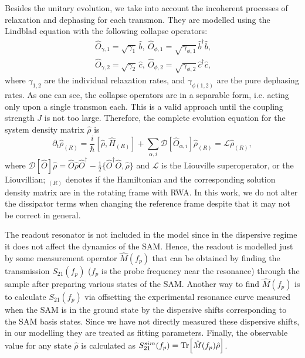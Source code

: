 \documentclass[%
 pra,
 amsmath,amssymb,
 reprint,%
]{revtex4-1}
\begin{document}
Besides the unitary evolution, we take into 
account the incoherent processes of relaxation 
and dephasing for each transmon. They are 
modelled using the Lindblad equation with the 
following collapse 
operators\cite{bishop2010circuit}:
\begin{equation}\
\begin{split}
\hat{{O}}_{\gamma, 1} = \sqrt{\gamma_1}\, \hat b,\ 
\hat{{O}}_{\phi, 1} = \sqrt{\gamma_{\phi,1}}\, 
\hat b^\dag \hat b,\\
\hat{{O}}_{\gamma,2} = \sqrt{\gamma_2}\, \hat c,\ 
\hat{{O}}_{\phi,2} = \sqrt{\gamma_{ \phi,2}}\, 
\hat c^\dag \hat c,
\end{split}
\end{equation}
where $\gamma_{1,2}$ are the individual 
relaxation rates, and $\gamma_{\phi (1,2)}$ are 
the pure dephasing rates. As one can see, the 
collapse operators are in a separable form, i.e. 
acting only upon a single transmon each. This is 
a valid approach until the coupling strength $J$ 
is not too large\cite{beaudoin2011dissipation}. 
Therefore, the complete evolution equation for 
the system density matrix $\hat \rho$ is
\begin{equation}
\partial_t \hat \rho_{(R)} = \frac{i}{\hbar}[\hat 
\rho, \hat H_{(R)}] + \sum_{\alpha, i} 
\mathcal{D}[\hat{O}_{\alpha, i}] \hat \rho_{(R)} 
= \mathcal{L}\hat\rho_{(R)}, \label{eq:master}
\end{equation}
where $\mathcal{D}[\hat{{O}}]\hat \rho = 
\hat{{O}} \hat \rho \hat{{O}}^\dag - 
\frac{1}{2}\{ \hat{{O}}^\dag \hat{{O}}, \hat 
\rho\}$ and $\mathcal{L}$ is the Liouville 
superoperator, or the Liouvillian; $_{(R)}$ 
denotes if the Hamiltonian and the corresponding 
solution density matrix are in the rotating frame 
with RWA. In this work, we do not alter the 
dissipator terms when changing the reference 
frame despite that it may not be correct in 
general\cite{shavit2019bridging}.


The readout resonator is not included in the 
model since in the dispersive regime it does not 
affect the dynamics of the SAM. Hence, the 
readout is modelled just by some measurement 
operator $\hat M(f_p)$ that can be obtained by 
finding the transmission $S_{21}(f_p)$ ($f_p$ is 
the probe frequency near the resonance) through 
the sample after preparing various states of the 
SAM. Another way to find $\hat M(f_p)$ is to 
calculate $S_{21}(f_p)$ via offsetting the 
experimental resonance curve measured when the 
SAM is in the ground state by the dispersive 
shifts corresponding to the SAM basis 
states\cite{filipp2009two, chow2010detecting}. Since we have not 
directly measured these dispersive shifts, in our 
modelling they are treated as fitting parameters. 
Finally, the observable value for any state $\hat 
\rho$ is calculated as $S_{21}^{sim}(f_p) = 
\Tr[\hat M(f_p) \hat \rho]$.
\end{document}
